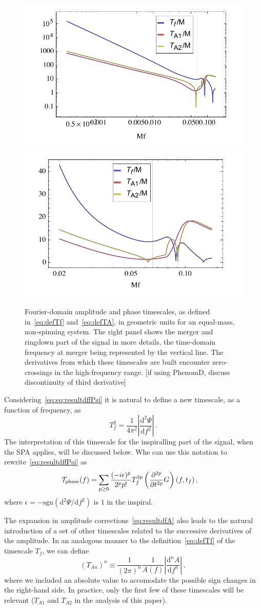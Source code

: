 \documentclass[aps,showpacs,twocolumn,
prd,superscriptaddress,nofootinbib]{revtex4-1}
\newcommand{\be}{\begin{equation}}
\newcommand{\ee}{\end{equation}}
\newcommand\ud{{\mathrm{d}}}
\newcommand\calT{{\mathcal{T}}}
\newcommand{\tf}{t_{f}}
\newcommand{\Tf}{T_{f}}
\begin{document}
\begin{figure}
  \centering
  \includegraphics[width=.48\linewidth]{plots/TfTA.pdf}
  \hspace{0.2cm}
  \includegraphics[width=.48\linewidth]{plots/TfTAzoom.pdf}
  \caption{Fourier-domain amplitude and phase timescales, as defined in~\eqref{eq:defTf} and~\eqref{eq:defTA}, in geometric units for an equal-mass, non-spinning system. The right panel shows the merger and ringdown part of the signal in more details, the time-domain frequency at merger being represented by the vertical line. The derivatives from which these timescales are built encounter zero-crossings in the high-frequency range. [if using PhenomD, discuss discontinuity of third derivative]}
  \label{fig:TfTA}
\end{figure}

Considering~\eqref{eq:eq:resultdffPsi} it is natural to define a new timescale, as a function of frequency, as
\be\label{eq:defTf}
	\Tf^{2} = \frac{1}{4\pi^{2}}\left| \frac{\ud^{2}\Psi}{\ud f^{2}} \right| \,.
\ee
The interpretation of this timescale for the inspiralling part of the signal, when the SPA applies, will be discussed below. Whe can use this notation to rewrite~\eqref{eq:resultdffPsi} as
\begin{align}\label{eq:resultdffPsiTf}
	 \calT_{\rm phase}(f) &= \sum\limits_{p\geq 0} \frac{(-i\epsilon)^{p}}{2^{p}p!} \Tf^{2p} \left( \frac{\partial^{2p} }{\partial t^{2p}} G \right)(f, \tf) \,,
\end{align}
where $\epsilon = -\mathrm{sgn}(\ud^{2}\Psi/\ud f^{2} )$ is $1$ in the inspiral.

The expansion in amplitude corrections~\eqref{eq:resultdfA} also leads to the natural introduction of a set of other timescales related to the successive derivatives of the amplitude. In an analogous manner to the definition~\eqref{eq:defTf} of the timescale $T_{f}$, we can define
\be\label{eq:defTA}
	\left( T_{An} \right)^{n} \equiv \frac{1}{(2 \pi)^{n}} \frac{1}{A(f)} \left| \frac{\ud^{n} A}{\ud f^{n}} \right| \,,
\ee
where we included an absolute value to accomodate the possible sign changes in the right-hand side. In practice, only the first few of these timescales will be relevant ($T_{A1}$ and $T_{A2}$ in the analysis of this paper).
\end{document}
